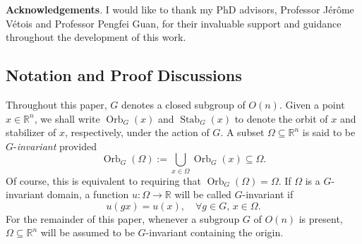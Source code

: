 \documentclass[10pt, reqno]{amsart}
\newcommand{\RR}{\mathbb{R}}
\newcommand{\Om}{\Omega}
\numberwithin{equation}{section}
\theoremstyle{definition}
\theoremstyle{remark}
\theoremstyle{plain}
\begin{document}
	
	
	\noindent\textbf{Acknowledgements}. I would like to thank my PhD advisors, Professor J\'er\^ome V\'etois and Professor Pengfei Guan, for their invaluable support and guidance throughout the development of this work. 
	
	\subsection{Notation and Proof Discussions}
	
	Throughout this paper, $G$ denotes a closed subgroup of $O(n)$. Given a point $x \in \RR^n$, we shall write $\operatorname{Orb}_G(x)$ and $\operatorname{Stab}_G(x)$ to denote the orbit of $x$ and stabilizer of $x$, respectively, under the action of $G$. A subset $\Om \subseteq \RR^n$ is said to be $G$-\emph{invariant} provided 
	\[
	\operatorname{Orb}_G(\Om) := \bigcup_{x \in \Om} \operatorname{Orb}_G(x) \subseteq \Om.
	\]
	Of course, this is equivalent to requiring that $\operatorname{Orb}_G(\Om) = \Om$. If $\Om$ is a $G$-invariant domain, a function $u : \Om \to \RR$ will be called $G$-invariant if 
	\[
	u(gx) = u(x), \quad \forall g \in G,\, x \in \Om.
	\]
	For the remainder of this paper, whenever a subgroup $G$ of $O(n)$ is present, $\Om \subseteq \RR^n$ will be assumed to be $G$-invariant containing the origin.
	
\end{document}
